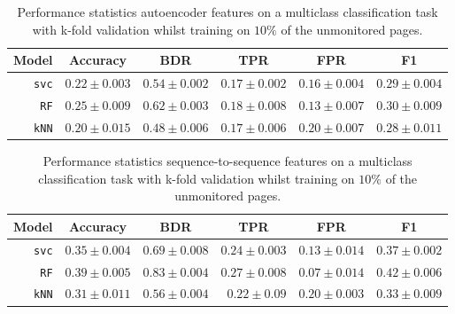 \begin{table}[ht]
  \centering
  \begin{tabular}{ r  r  r  r  r  r } \hline
    \multicolumn{1}{c}{\textbf{Model}} & \multicolumn{1}{c}{\textbf{Accuracy}} & \multicolumn{1}{c}{\textbf{BDR}} & \multicolumn{1}{c}{\textbf{TPR}} &
      \multicolumn{1}{c}{\textbf{FPR}} & \multicolumn{1}{c}{\textbf{F1}} \\ \hline

    \texttt{svc} & $0.22 \pm 0.003$ & $0.54 \pm 0.002$ & $0.17 \pm 0.002$ & $0.16 \pm 0.004$ & $0.29 \pm 0.004$ \\

    \texttt{RF} & $0.25 \pm 0.009$ & $0.62 \pm 0.003$ & $0.18 \pm 0.008$ & $0.13 \pm 0.007$ & $0.30 \pm 0.009$\\

    \texttt{kNN} & $0.20 \pm 0.015$ & $0.48 \pm 0.006$ & $0.17 \pm 0.006$ & $0.20 \pm 0.007$ & $0.28 \pm 0.011$ \\

    \hline
  \end{tabular}
  \caption{Performance statistics autoencoder features on a multiclass classification task with k-fold validation whilst training on $10\%$ of the unmonitored pages.}
  \label{table:mult-ae-test-error}
\end{table}

\begin{table}[ht]
  \centering
  \begin{tabular}{ r  r  r  r  r  r } \hline
    \multicolumn{1}{c}{\textbf{Model}} & \multicolumn{1}{c}{\textbf{Accuracy}} & \multicolumn{1}{c}{\textbf{BDR}} & \multicolumn{1}{c}{\textbf{TPR}} &
      \multicolumn{1}{c}{\textbf{FPR}} & \multicolumn{1}{c}{\textbf{F1}} \\ \hline

    \texttt{svc} & $0.35 \pm 0.004$ & $0.69 \pm 0.008$ & $0.24 \pm 0.003$ & $0.13 \pm 0.014$ & $0.37 \pm 0.002$ \\

    \texttt{RF} & $0.39 \pm 0.005$ & $0.83 \pm 0.004$ & $0.27 \pm 0.008$ & $0.07 \pm 0.014$ & $0.42 \pm 0.006$\\

    \texttt{kNN} & $0.31 \pm 0.011$ & $0.56 \pm 0.004$ & $0.22 \pm 0.09$ & $0.20 \pm 0.003$ & $0.33 \pm 0.009$ \\

    \hline
  \end{tabular}
  \caption{Performance statistics sequence-to-sequence features on a multiclass classification task with k-fold validation whilst training on $10\%$ of the unmonitored pages.}
  \label{table:mult-seq2seq-test-error}
\end{table}

